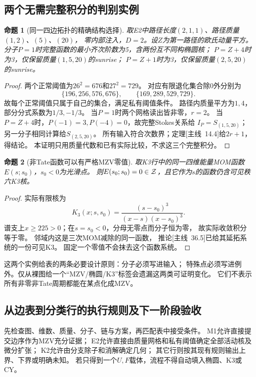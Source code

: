 \documentclass[11pt,a4paper]{ctexart}
\theoremstyle{cnplain}\newtheorem{theorem}{定理}[section]
\newtheorem{proposition}[theorem]{命题}
\theoremstyle{definition}\newtheorem{definition}[theorem]{定义}
\theoremstyle{remark}\newtheorem{remark}[theorem]{注}
\begin{document}
\subsection{两个无需完整积分的判别实例}
\label{subsec:classworked}
\begin{proposition}[同一四边拓扑的精确结构选择]\label{prop:classthetaselector}
取E2中路径长度$(2,1,1)$、路径质量$(1,2)$、$(5)$、$(20)$，
零内部注入，$D=2$。设$Z$为第一路径的欧氏动量平方。
分子$P=1$时完整函数的最小齐次阶数为5，含两份互不同构椭圆核；
$P=Z+4$时为3，仅保留质量$(1,5,20)$的sunrise；
$P=Z+1$时为3，仅保留质量$(2,5,20)$的sunrise。
\end{proposition}
\begin{proof}
两个正常阈值为$26^2=676$和$27^2=729$。
对应有限退化集合除$0$外分别为
\[
 \{196,256,576,676\},\qquad\{169,289,529,729\}.
\]
故每个正常阈值只属于自己的集合，满足私有阈值条件。
路径内质量平方为$1,4$，部分分式系数为$1/3,-1/3$。
当$P=1$时两个网格读出皆非零，$r=2$。
当$P=Z+4$时，$P(-1)=3,P(-4)=0$，故完整Stokes关系给
$I_P=S_{(1,5,20)}$；另一分子相同计算给$S_{(2,5,20)}$。
所有输入符合次数界；定理\textup{[主线~14.4]}给$2r+1$，得结论。
本证明只用质量代数和已有实际比较，不求这三个完整积分。
\end{proof}

\begin{proposition}[非Tate函数可以有严格MZV零值]\label{prop:classmomzero}
取K3行中的同一四维能量MOM函数$E(s;s_0)$，$s_0<0$为光滑点。
则$E(s_0;s_0)=0\in\cal Z$，且它作为$s$的函数仍含可见秩六K3核。
\end{proposition}
\begin{proof}
实际有限核为
\[
 K_3(x;s,s_0)=\frac{(s-s_0)^3}{(x-s)(x-s_0)^3}.
\]
谱支上$x\ge225>0$；在$s=s_0<0$，分母无零点而分子恒为零，
故实际收敛积分等于零。
邻域内这是三次MOM减除的同一函数，
推论\textup{[主线~36.5]}已给其延拓系统的一份可见K3。
固定一个零值不会抹去这个函数系统。
\end{proof}

这两个实例给表的两条必要设计原则：分子必须写进输入；
特殊点必须写进例外。仅从裸图给一个“MZV/椭圆/K3”标签会遗漏这两类可证明变化。
它们不表示所有非零非Tate周期都能在某点化成MZV。

\subsection{从边表到分类行的执行规则及下一阶段验收}
\label{subsec:classprogram}
先检查图、维数、质量、分子、链与方案，再匹配表中接受条件。
M1允许直接提交边序作为MZV充分证据；
E2允许直接由质量网格和私有阈值确定全部活动核及微分扩张；
K2允许由分支除子和消解确定几何；
其它行则按其现有规则输出上界、下界或明确未知。
若只得到一个$U,F$载体，流程不得自动填入椭圆、K3或CY。
\end{document}
